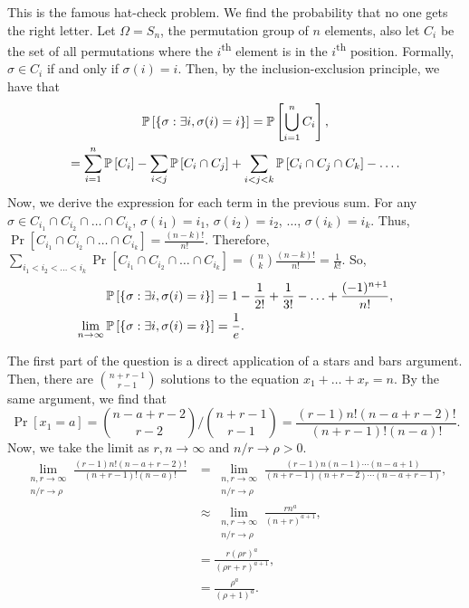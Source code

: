 \begin{solution}
    This is the famous hat-check problem. We find the probability that no one
    gets the right letter. Let $\Omega = S_n$, the permutation group of $n$
    elements, also let $C_i$ be the set of all permutations where the
    $i$\textsuperscript{th} element is in the $i$\textsuperscript{th} position.
    Formally, $\sigma \in C_i$ if and only if $\sigma(i) = i$. Then, by the
    inclusion-exclusion principle, we have that 
    \begin{gather*}
        \mathbb{P}\left[{\left\{ \sigma: \exists i, \sigma(i) = i \right\}}\right] = \mathbb{P}\left[{\bigcup_{i=1}^n C_i}\right], \\
        = \sum_{i=1}^n \mathbb{P}\left[{C_i}\right] - \sum_{i < j} \mathbb{P}\left[{C_i \cap C_j}\right] + \sum_{i < j < k} \mathbb{P}\left[{C_i \cap C_j \cap C_k}\right] - \ldots.
    \end{gather*}
    Now, we derive the expression for each term in the previous sum. For any
    $\sigma \in C_{i_1} \cap C_{i_2} \cap \ldots \cap C_{i_k}$, $\sigma(i_1) =
    i_1$, $\sigma(i_2) = i_2$, $\ldots$, $\sigma(i_k) = i_k$. Thus,
    $\Pr\left[{C_{i_1} \cap C_{i_2} \cap \ldots \cap C_{i_k}}\right] =
    \frac{(n-k)!}{n!}$. Therefore, $\sum_{i_1 < i_2 < \ldots < i_k}
    \Pr\left[{C_{i_1} \cap C_{i_2} \cap \ldots \cap C_{i_k}}\right] =
    \binom{n}{k}\frac{(n-k)!}{n!} = \frac{1}{k!}$. So,
    \begin{align*}
        \mathbb{P}\left[{\left\{ \sigma: \exists i, \sigma(i) = i \right\}}\right] &= 1 - \frac{1}{2!} + \frac{1}{3!} - \ldots + \frac{(-1)^{n+1}}{n!}, \\
        \lim_{n\to\infty} \mathbb{P}\left[{\left\{ \sigma: \exists i, \sigma(i) = i \right\}}\right] &= \frac{1}{e}.
    \end{align*}
\end{solution}
\begin{problem}{6}
\end{problem}
\begin{solution}
    The first part of the question is a direct application of a stars and bars
    argument. Then, there are $\binom{n+r-1}{r-1}$ solutions to the equation
    $x_1 + \ldots + x_r = n$. By the same argument, we find that 
    \[
        \Pr\left[{x_1 = a}\right] = \binom{n-a+r-2}{r-2} / \binom{n+r-1}{r-1} =  \frac{(r-1)n!(n-a+r-2)!}{(n+r-1)!(n-a)!}.
    \]
    Now, we take the limit as $r,n\to\infty$ and $n/r \to \rho > 0$. 
    \begin{align*}
        \lim_{\substack{n,r\to\infty\\ n/r\to\rho}}  \frac{(r-1)n!(n-a+r-2)!}{(n+r-1)!(n-a)!} &= \lim_{\substack{n,r\to\infty\\ n/r\to\rho}} \frac{(r-1)n(n-1)\cdots (n-a+1)}{(n+r-1)(n+r-2)\cdots (n-a+r-1)}, \\
        &\approx  \lim_{\substack{n,r\to\infty\\ n/r\to\rho}} \frac{rn^a}{(n+r)^{a+1}}, \\
        &= \frac{r(\rho r)^a}{(\rho r + r)^{a+1}}, \\
        &= \frac{\rho^a}{(\rho + 1)^a}.
    \end{align*}
\end{solution}
